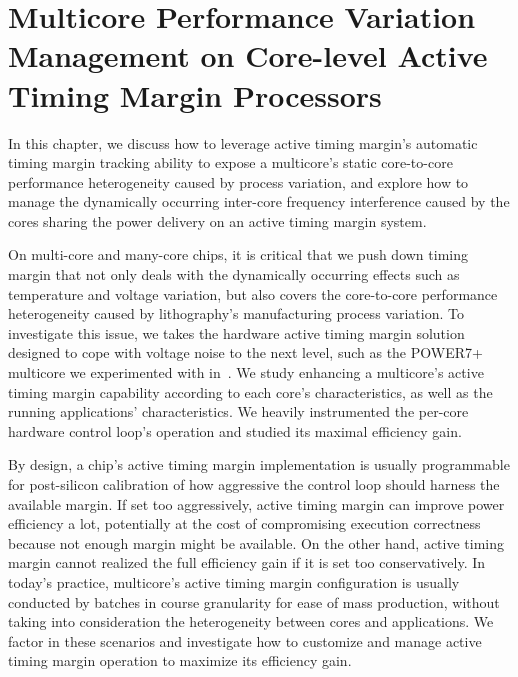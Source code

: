 
\chapter{Multicore Performance Variation Management on Core-level Active Timing Margin Processors}
\label{sec:process}

In this chapter, we discuss how to leverage active timing margin's automatic timing margin tracking ability to expose a multicore's static core-to-core performance heterogeneity caused by process variation, and explore how to manage the dynamically occurring inter-core frequency interference caused by the cores sharing the power delivery on an active timing margin system.

On multi-core and many-core chips, it is critical that we push down timing margin that not only deals with the dynamically occurring effects such as temperature and voltage variation, but also covers the core-to-core performance heterogeneity caused by lithography's manufacturing process variation. To investigate this issue, we takes the hardware active timing margin solution designed to cope with voltage noise to the next level, such as the POWER7+ multicore we experimented with in~. We study enhancing a multicore's active timing margin capability according to each core's characteristics, as well as the running applications' characteristics. We heavily instrumented the per-core hardware control loop's operation and studied its maximal efficiency gain.

By design, a chip's active timing margin implementation is usually programmable for post-silicon calibration of how aggressive the control loop should harness the available margin. If set too aggressively, active timing margin can improve power efficiency a lot, potentially at the cost of compromising execution correctness because not enough margin might be available. On the other hand, active timing margin cannot realized the full efficiency gain if it is set too conservatively. In today's practice, multicore's active timing margin configuration is usually conducted by batches in course granularity for ease of mass production, without taking into consideration the heterogeneity between cores and applications. We factor in these scenarios and investigate how to customize and manage active timing margin operation to maximize its efficiency gain.

